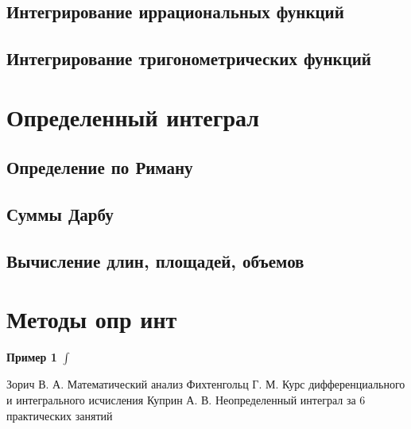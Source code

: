 \documentclass[a4paper]{article}
\begin{document}
\subsection{Интегрирование иррациональных функций}
\subsection{Интегрирование тригонометрических функций}
\section{Определенный интеграл}
\subsection{Определение по Риману}
\subsection{Суммы Дарбу}
\subsection{Вычисление длин, площадей, объемов}











\section{Методы опр инт}
\textbf{Пример 1} $\int\limits$
\begin{thebibliography}{}
Зорич В. А. Математический анализ
Фихтенгольц Г. М. Курс дифференциального и интегрального исчисления
Куприн А. В. Неопределенный интеграл за 6 практических занятий

\end{thebibliography}
\end{document}
